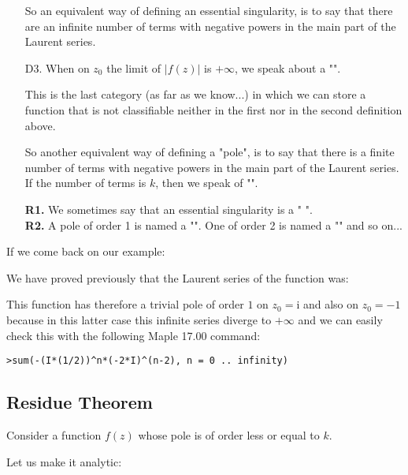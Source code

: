 \begin{enumerate}
		So an equivalent way of defining an essential singularity, is to say that there are an infinite number of terms with negative powers in the main part of the Laurent series.
		
		\item[D3.] When on $z_0$ the limit of $\vert f(z) \vert$ is $+\infty$, we speak about a "\label{pole}".
		
		This is the last category (as far as we know...) in which we can store a function that is not classifiable neither in the first nor in the second definition above.
		
		So another equivalent way of defining a "pole", is to say that there is a finite number of terms with negative powers in the main part of the Laurent series. If the number of terms is $k$, then we speak of "".
		
	\begin{tcolorbox}[title=Remarks,arc=10pt,breakable,drop lifted shadow,
  skin=enhanced,
  skin first is subskin of={enhancedfirst}{arc=10pt,no shadow},
  skin middle is subskin of={enhancedmiddle}{arc=10pt,no shadow},
  skin last is subskin of={enhancedlast}{drop lifted shadow}]
	\textbf{R1.} We sometimes say that an essential singularity is a " ".\\
	
	\textbf{R2.} A pole of order 1 is named a "". One of order 2 is named a "" and so on...
	\end{tcolorbox}
	\end{enumerate}
	If we come back on our example:
	
	We have proved previously that the Laurent series of the function was:
	
	This function has therefore a trivial pole of order $1$ on $z_0=\mathrm{i}$ and also on $z_0=-1$ because in this latter case this infinite series diverge to $+\infty$ and we can easily check this with the following Maple 17.00 command:
	
	\texttt{>sum(-(I*(1/2))\string^n*(-2*I)\string^(n-2), n = 0 .. infinity)}
	
	\subsection{Residue Theorem}\label{residue theorem}
	Consider a function $f(z)$ whose pole is of order less or equal to $k$.
	
	Let us make it  analytic:
	
